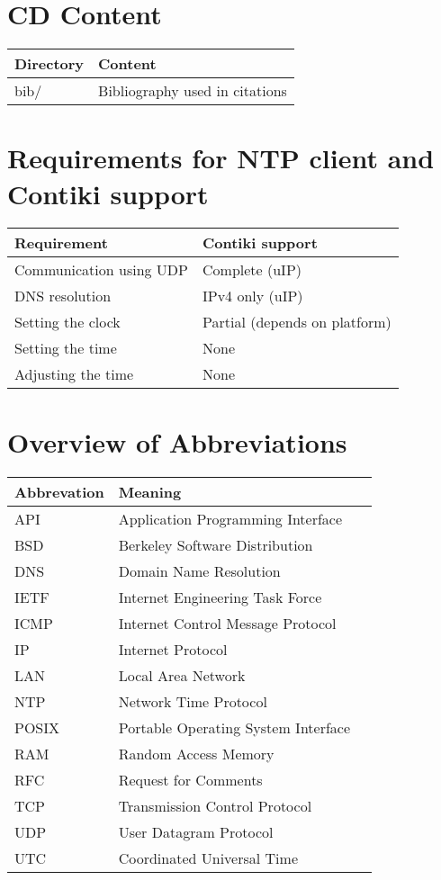 
\chapter{CD Content}
\begin{tabular}{|l|l|}
	\hline
	Directory & Content \\ \hline
	bib/ & Bibliography used in citations \\
	\hline
\end{tabular}

\chapter{Requirements for NTP client and Contiki support}
\begin{tabular}{|l|l|}
	\hline
	Requirement & Contiki support \\ \hline
	Communication using UDP & Complete (uIP) \\
	DNS resolution & IPv4 only (uIP) \\
	Setting the clock & Partial (depends on platform) \\
	Setting the time & None \\
	Adjusting the time & None \\
	\hline
\end{tabular}

\chapter{Overview of Abbreviations}
\begin{tabular}{|l|l|l|}
	\hline
	Abbrevation & Meaning \\ \hline
	API & Application Programming Interface \\
	BSD & Berkeley Software Distribution \\
	DNS & Domain Name Resolution \\
	IETF & Internet Engineering Task Force \\
	ICMP & Internet Control Message Protocol \\
	IP & Internet Protocol \\
	LAN & Local Area Network \\
	NTP & Network Time Protocol \\
	POSIX & Portable Operating System Interface \\
	RAM & Random Access Memory \\
	RFC & Request for Comments \\
	TCP & Transmission Control Protocol \\
	UDP & User Datagram Protocol \\
	UTC & Coordinated Universal Time \\
	\hline
\end{tabular}
